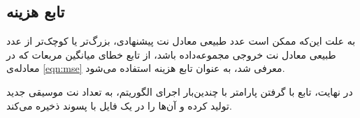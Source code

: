 
\subsection{تابع هزینه}
به علت این‌که ممکن است عدد طبیعی معادل نت پیشنهادی، بزرگ‌تر یا کوچک‌تر از عدد طبیعی معادل نت خروجی مجموعه‌داده باشد، از تابع خطای میانگین مربعات که در معادله‌ی
\ref{eqn:mse}
معرفی شد، به عنوان تابع هزینه استفاده می‌شود.

در نهایت، تابع
با گرفتن پارامتر
با چندین‌بار اجرای الگوریتم، به تعداد
نت موسیقی جدید تولید کرده و آن‌ها را در یک فایل با پسوند
ذخیره می‌کند.

